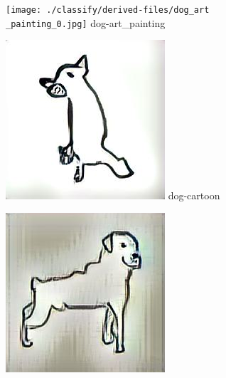 \documentclass{article}
\begin{document}
\begin{figure}[htp]
    \centering
    \begin{minipage}{0.14285714285714285\linewidth}
        \texttt{[image: ./classify/derived-files/dog\_art\\\_painting\_0.jpg]}
        {dog-art\_painting}
    \end{minipage}%
    \begin{minipage}{0.14285714285714285\linewidth}
        \includegraphics[width=\linewidth]{./classify/derived-files/dog_cartoon_0.jpg}
        {dog-cartoon}
    \end{minipage}%
    \begin{minipage}{0.14285714285714285\linewidth}
        \includegraphics[width=\linewidth]{./classify/derived-files/dog_photo_0.jpg}

\end{minipage}
\end{figure}
\end{document}
